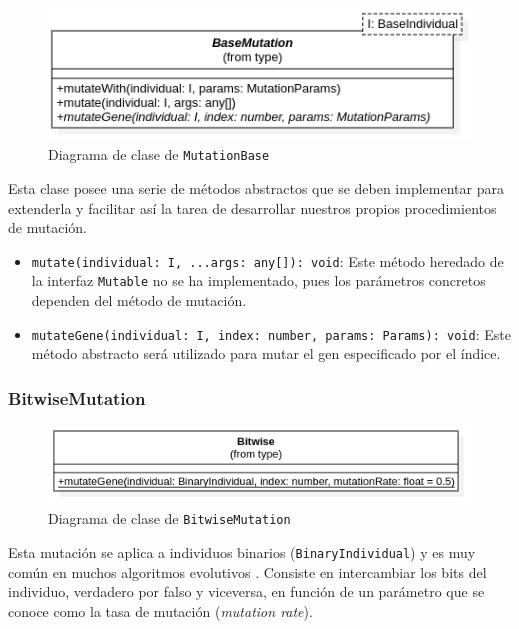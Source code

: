 \begin{figure}[ht]
    \centering
    \includegraphics[scale=0.5]{mem/images/cap-4/4.2.7(Mutation)/BaseMutation.png}
    \caption{Diagrama de clase de \texttt{MutationBase}}
    \label{fig:my_label}
\end{figure}

Esta clase posee una serie de métodos abstractos que se deben implementar para extenderla y facilitar así la tarea de desarrollar nuestros propios procedimientos de mutación.

\begin{itemize}
    \item \texttt{mutate(individual: I, ...args: any[]): void}: Este método heredado de la interfaz \texttt{Mutable} no se ha implementado, pues los parámetros concretos dependen del método de mutación.
    \item \texttt{mutateGene(individual: I, index: number, params: Params): void}: Este método abstracto será utilizado para mutar el gen especificado por el índice.
\end{itemize}

\subsubsection{BitwiseMutation}

\begin{figure}[ht]
    \centering
    \includegraphics[scale=0.5]{mem/images/cap-4/4.2.7(Mutation)/Bitwise.png}
    \caption{Diagrama de clase de \texttt{BitwiseMutation}}
    \label{fig:my_label}
\end{figure}

Esta mutación se aplica a individuos binarios (\texttt{BinaryIndividual}) y es muy común en muchos algoritmos evolutivos \cite{holland1992adaptation}. Consiste en intercambiar los bits del individuo, verdadero por falso y viceversa, en función de un parámetro que se conoce como la tasa de mutación (\textit{mutation rate}). \\

